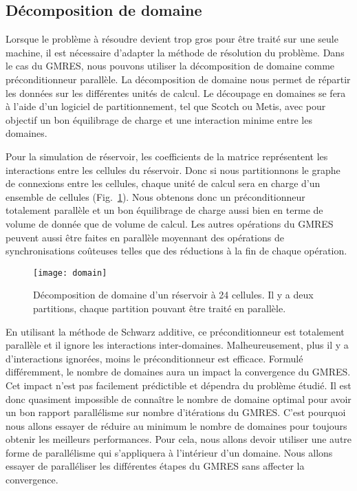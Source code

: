 \subsection{Décomposition de domaine}
Lorsque le problème à résoudre devient trop gros pour être traité sur une seule machine, il est nécessaire d'adapter la méthode de résolution du problème.
%
Dans le cas du GMRES, nous pouvons utiliser la décomposition de domaine comme préconditionneur parallèle.
%
La décomposition de domaine nous permet de répartir les données sur les différentes unités de calcul.
%
Le découpage en domaines se fera à l'aide d'un logiciel de partitionnement, tel que Scotch ou Metis, avec pour objectif un bon équilibrage de charge et une interaction minime entre les domaines.


Pour la simulation de réservoir, les coefficients de la matrice représentent les interactions entre les cellules du réservoir.
%
Donc si nous partitionnons le graphe de connexions entre les cellules, chaque unité de calcul sera en charge d'un ensemble de cellules (Fig.~\ref{fig:domain}).
%
Nous obtenons donc un préconditionneur totalement parallèle et un bon équilibrage de charge aussi bien en terme de volume de donnée que de volume de calcul.
%
Les autres opérations du GMRES peuvent aussi être faites en parallèle moyennant des opérations de synchronisations coûteuses telles que des réductions à la fin de chaque opération.

\begin{figure}
  \centering
  \texttt{[image: domain]}
  \caption{Décomposition de domaine d'un réservoir à 24 cellules. Il y a deux partitions, chaque partition pouvant être traité en parallèle.}
  \label{fig:domain}
\end{figure}

En utilisant la méthode de Schwarz additive, ce préconditionneur est totalement parallèle et il ignore les interactions inter-domaines.
%
Malheureusement, plus il y a d'interactions ignorées, moins le préconditionneur est efficace.
%
Formulé différemment, le nombre de domaines aura un impact la convergence du GMRES.
%
Cet impact n'est pas facilement prédictible et dépendra du problème étudié.
%
Il est donc quasiment impossible de connaître le nombre de domaine optimal pour avoir un bon rapport parallélisme sur nombre d'itérations du GMRES.
%
C'est pourquoi nous allons essayer de réduire au minimum le nombre de domaines pour toujours obtenir les meilleurs performances.
%
Pour cela, nous allons devoir utiliser une autre forme de parallélisme qui s'appliquera à l'intérieur d'un domaine.
%
Nous allons essayer de paralléliser les différentes étapes du GMRES sans affecter la convergence.
